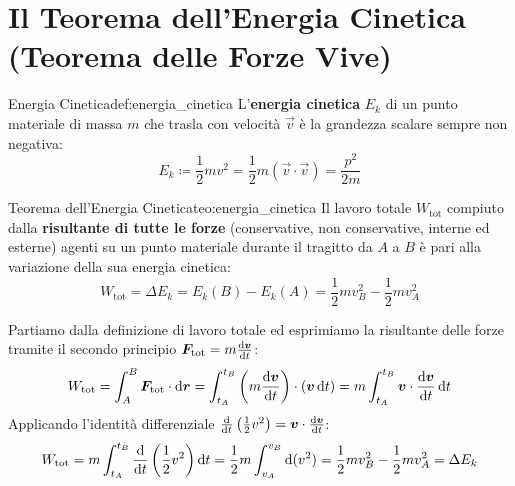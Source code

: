 \section{Il Teorema dell'Energia Cinetica (Teorema delle Forze Vive)}
\label{sec:teorema_forze_vive}

\begin{definizione}{Energia Cinetica}{def:energia_cinetica}
L'\textbf{energia cinetica} $E_k$ di un punto materiale di massa $m$ che trasla con velocità $\vec{v}$ è la grandezza scalare sempre non negativa:
\begin{equation}
    E_k \coloneqq \frac{1}{2}m v^2 = \frac{1}{2}m (\vec{v}\cdot\vec{v}) = \frac{p^2}{2m}
    \label{eq:energia_cinetica}
\end{equation}
\end{definizione}

\begin{teorema}{Teorema dell'Energia Cinetica}{teo:energia_cinetica}
Il lavoro totale $W_{\text{tot}}$ compiuto dalla \textbf{risultante di tutte le forze} (conservative, non conservative, interne ed esterne) agenti su un punto materiale durante il tragitto da $A$ a $B$ è pari alla variazione della sua energia cinetica:
\begin{equation}
    W_{\text{tot}} = \Delta E_k = E_k(B) - E_k(A) = \frac{1}{2}m v_B^2 - \frac{1}{2}m v_A^2
    \label{eq:teorema_forze_vive}
\end{equation}
\end{teorema}

\begin{dimostrazione}
Partiamo dalla definizione di lavoro totale ed esprimiamo la risultante delle forze tramite il secondo principio $\bm{F}_{\text{tot}} = m\frac{\mathrm{d} \bm{v}}{\mathrm{d} t}$:
\begin{equation}
    W_{\text{tot}} = \int_A^B \bm{F}_{\text{tot}}\cdot\mathrm{d}\bm{r} = \int_{t_A}^{t_B} \left(m\frac{\mathrm{d} \bm{v}}{\mathrm{d} t}\right)\cdot(\bm{v}\,\mathrm{d} t) = m \int_{t_A}^{t_B} \bm{v}\cdot\frac{\mathrm{d} \bm{v}}{\mathrm{d} t}\,\mathrm{d} t
\end{equation}
Applicando l'identità differenziale $\frac{\mathrm{d} }{\mathrm{d} t}\left(\frac{1}{2}v^2\right) = \bm{v}\cdot\frac{\mathrm{d} \bm{v}}{\mathrm{d} t}$:
\begin{equation}
    W_{\text{tot}} = m \int_{t_A}^{t_B} \frac{\mathrm{d} }{\mathrm{d} t}\left(\frac{1}{2}v^2\right)\mathrm{d} t = \frac{1}{2}m \int_{v_A}^{v_B} \mathrm{d}(v^2) = \frac{1}{2}m v_B^2 - \frac{1}{2}m v_A^2 = \Delta E_k
\end{equation}
\end{dimostrazione}

